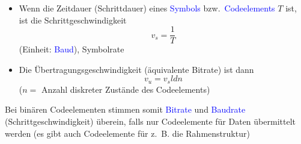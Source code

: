 \begin{itemize}
    \item Wenn die Zeitdauer (Schrittdauer) eines \textcolor{blue}{Symbols} bzw.\ \textcolor{blue}{Codeelements} $T$ ist,
    ist die Schrittgeschwindigkeit \[v_s = \frac{1}{T}\] (Einheit: \textcolor{blue}{Baud}), Symbolrate
    \item Die Übertragungsgeschwindigkeit (äquivalente Bitrate) ist dann \[v_u = v_s ld n\] ($n=$ Anzahl diskreter Zustände des Codeelements)
\end{itemize}
Bei binären Codeelementen stimmen somit \textcolor{blue}{Bitrate} und \textcolor{blue}{Baudrate} (Schrittgeschwindigkeit) überein, falls nur Codeelemente für Daten übermittelt werden (es gibt auch Codeelemente für z.\ B. die Rahmenstruktur)

